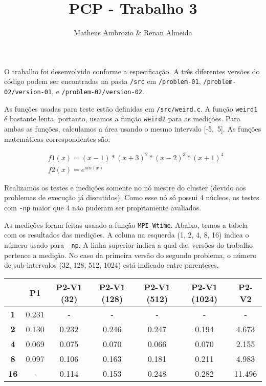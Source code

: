 \documentclass[12pt]{article}
\def\code#1{\texttt{#1}}
\begin{document}
 
\title{PCP - Trabalho 3}
\author{Matheus Ambrozio \& Renan Almeida}
 
\maketitle

O trabalho foi desenvolvido conforme a especificação. A três diferentes versões do código podem ser encontradas na pasta \code{/src} em \code{/problem-01}, \code{/problem-02/version-01}, e \code{/problem-02/version-02}.

As funções usadas para teste estão definidas em \code{/src/weird.c}. A função \code{weird1} é bastante lenta, portanto, usamos a função \code{weird2} para as medições. Para ambas as funções, calculamos a área usando o mesmo intervalo [-5,~5]. As funções matemáticas correspondentes são:

\begin{align}
& f1(x) = (x - 1) * (x + 3)^2 * (x - 2)^3 * (x + 1)^4 \\
& f2(x) = e^{sin(x)}
\end{align}

Realizamos os testes e medições somente no nó mestre do cluster (devido aos problemas de execução já discutidos). Como esse nó só possui 4 núcleos, os testes com \code{-np} maior que 4 não puderam ser propriamente avaliados.

As medições foram feitas usando a função \code{MPI\_Wtime}. Abaixo, temos a tabela com os resultados das medições. A coluna na esquerda (1, 2, 4, 8, 16) indica o número usado para~\code{-np}. A linha superior indica a qual das versões do trabalho pertence a medição. No caso da primeira versão do segundo problema, o número de sub-intervalos (32, 128, 512, 1024) está indicado entre parenteses.

\begin{table}[h]
\begin{tabular}{|c|c|c|c|c|c|c|}
\hline
    { }                     &
    {\textbf{P1}}           &
    {\textbf{P2-V1 (32)}}   &
    {\textbf{P2-V1 (128)}}  &
    {\textbf{P2-V1 (512)}}  &
    {\textbf{P2-V1 (1024)}} &
    {\textbf{P2-V2}}        \\
\hline
{\textbf{1}}  & 0.231   & -     & -     & -     & -     & -      \\ \hline
{\textbf{2}}  & 0.130   & 0.232 & 0.246 & 0.247 & 0.194 & 4.673  \\ \hline
{\textbf{4}}  & 0.069   & 0.075 & 0.070 & 0.066 & 0.070 & 2.155  \\ \hline
{\textbf{8}}  & 0.097   & 0.106 & 0.163 & 0.181 & 0.211 & 4.983  \\ \hline
{\textbf{16}} & -       & 0.114 & 0.153 & 0.248 & 0.282 & 11.496 \\ \hline
\end{tabular}
\end{table}
\end{document}
